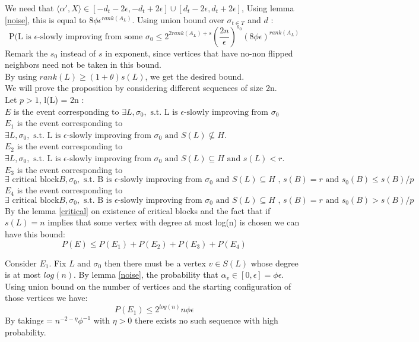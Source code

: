 \documentclass[12pt]{article}
\begin{document}
We need that $ \langle\alpha ', X \rangle \in [- d_t -2\epsilon, -d_t + 2\epsilon] \cup [d_t - 2\epsilon, d_t + 2\epsilon]$, Using lemma \ref{noise}, this is equal to $8\phi\epsilon^{rank(A_L)}$. Using union bound over $\sigma_{t \in T}$ and $d$ :
\begin{equation*}
\text{P(L is }\epsilon\text{-slowly improving from some }\sigma_0 \leq 2^{2rank(A_L) + s}(\frac{2n}{\epsilon})^{s_0}(8\phi\epsilon)^{rank(A_L)}
\end{equation*}
Remark the $s_0$ instead of $s$ in exponent, since vertices that have no-non flipped neighbors need not be taken in this bound. \\
By using  $rank(L) \geq (1+\theta)s(L)$, we get the desired bound. \\

We will prove the proposition by considering different sequences of size 2n.\\
Let $ p > 1$, l(L) = 2n : \\
$E$ is the event corresponding to $\exists L, \sigma_0, \text{ s.t. L is }\epsilon\text{-slowly improving from }\sigma_0 $\\
$E_1$ is the event corresponding to $\exists L, \sigma_0, \text{ s.t. L is }\epsilon\text{-slowly improving from }\sigma_0 \text{ and }S(L) \not\subseteq H$.\\
$E_2$ is the event corresponding to $\exists L, \sigma_0,\text{ s.t. L is }\epsilon\text{-slowly improving from }\sigma_0\text{ and }S(L) \subseteq H\text{ and }s(L) < r$. \\
$E_3$   is the event corresponding to $\exists \text{ critical block} B, \sigma_0,\text{ s.t. B is }\epsilon\text{-slowly improving from }\sigma_0\text{ and }S(L) \subseteq H \text{ , } s(B) = r \text{ and } s_0(B) \leq s(B) / p$ \\
$E_4$   is the event corresponding to $\exists \text{ critical block} B, \sigma_0,\text{ s.t. B is }\epsilon\text{-slowly improving from }\sigma_0\text{ and }S(L) \subseteq H \text{ , } s(B) = r \text{ and } s_0(B) > s(B) / p$ \\
By the lemma \ref{critical} on existence of critical blocks and the fact that if $s(L) = n$ implies that some vertex with degree at most log(n) is chosen we can have this bound:
\begin{equation*}
P(E) \leq P(E_1) + P(E_2) + P(E_3) + P(E_4)
\end{equation*}


Consider $E_1$. Fix $L$ and $\sigma_0$ then there must be a vertex $v \in S(L)$ whose degree is at most $log(n)$. By lemma  \ref{noise}, the probability that $\alpha_v \in [0, \epsilon] = \phi \epsilon$. Using union bound on the number of vertices and the starting configuration of those vertices we have:
\begin{equation}
P(E_1)  \leq 2^{log(n)}n \phi \epsilon
\end{equation}
By taking$\epsilon = n^{-2 - \eta} \phi^{-1}$ with $\eta > 0$ there exists no such sequence with high probability. \\
\end{document}
